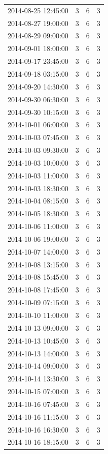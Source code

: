 \begin{tabular}{lrrr}
2014-08-25 12:45:00 & 3 & 6 & 3 \\
2014-08-27 19:00:00 & 3 & 6 & 3 \\
2014-08-29 09:00:00 & 3 & 6 & 3 \\
2014-09-01 18:00:00 & 3 & 6 & 3 \\
2014-09-17 23:45:00 & 3 & 6 & 3 \\
2014-09-18 03:15:00 & 3 & 6 & 3 \\
2014-09-20 14:30:00 & 3 & 6 & 3 \\
2014-09-30 06:30:00 & 3 & 6 & 3 \\
2014-09-30 10:15:00 & 3 & 6 & 3 \\
2014-10-01 06:00:00 & 3 & 6 & 3 \\
2014-10-03 07:45:00 & 3 & 6 & 3 \\
2014-10-03 09:30:00 & 3 & 6 & 3 \\
2014-10-03 10:00:00 & 3 & 6 & 3 \\
2014-10-03 11:00:00 & 3 & 6 & 3 \\
2014-10-03 18:30:00 & 3 & 6 & 3 \\
2014-10-04 08:15:00 & 3 & 6 & 3 \\
2014-10-05 18:30:00 & 3 & 6 & 3 \\
2014-10-06 11:00:00 & 3 & 6 & 3 \\
2014-10-06 19:00:00 & 3 & 6 & 3 \\
2014-10-07 14:00:00 & 3 & 6 & 3 \\
2014-10-08 13:15:00 & 3 & 6 & 3 \\
2014-10-08 15:45:00 & 3 & 6 & 3 \\
2014-10-08 17:45:00 & 3 & 6 & 3 \\
2014-10-09 07:15:00 & 3 & 6 & 3 \\
2014-10-10 11:00:00 & 3 & 6 & 3 \\
2014-10-13 09:00:00 & 3 & 6 & 3 \\
2014-10-13 10:45:00 & 3 & 6 & 3 \\
2014-10-13 14:00:00 & 3 & 6 & 3 \\
2014-10-14 09:00:00 & 3 & 6 & 3 \\
2014-10-14 13:30:00 & 3 & 6 & 3 \\
2014-10-15 07:00:00 & 3 & 6 & 3 \\
2014-10-16 07:45:00 & 3 & 6 & 3 \\
2014-10-16 11:15:00 & 3 & 6 & 3 \\
2014-10-16 16:30:00 & 3 & 6 & 3 \\
2014-10-16 18:15:00 & 3 & 6 & 3 \\

\end{tabular}
